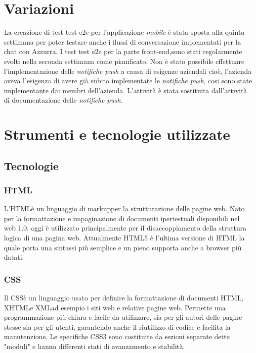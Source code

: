 \section{Variazioni}
La creazione di test \gls{test e2e}\ap{[g]} per l'applicazione \emph{mobile} è stata sposta alla quinta settimana per poter testare anche i flussi di conversazione implementati per la chat con Azzurra. I test \gls{test e2e}\ap{[g]} per la parte \gls{front-end}\ap{[g]},sono stati regolarmente svolti nella seconda settimana come pianificato. Non è stato possibile effettuare l'implementazione delle \emph{notifiche push} a causa di esigenze aziendali cioè, l'azienda aveva l'esigenza di avere già subito implementate le \emph{notifiche push}, cosi sono state implementante dai membri dell'azienda. L'attività è stata sostituita dall'attività di documentazione delle \emph{notifiche push}.

\section{Strumenti e tecnologie utilizzate}

\subsection{Tecnologie}

\subsubsection*{HTML}
L'\gls{HTML}\glsfirstoccur è un \gls{linguaggio di markup}\glsfirstoccur per la strutturazione delle pagine web. Nato per la formattazione e impaginazione di documenti ipertestuali disponibili nel web 1.0, oggi è utilizzato principalmente per il disaccoppiamento della struttura logica di una pagina web. Attualmente \gls{HTML}5 è l'ultima versione di \gls{HTML} la quale porta una sintassi più semplice e un pieno supporta anche a browser più datati.

\subsubsection*{CSS}
Il \gls{CSS}\glsfirstoccur è un linguaggio usato per definire la formattazione di documenti \gls{HTML}, \gls{XHTML}\glsfirstoccur e \gls{XML}\glsfirstoccur ad esempio i siti web e relative pagine web. Permette una programmazione più chiara e facile da utilizzare, sia per gli autori delle pagine stesse sia per gli utenti, garantendo anche il riutilizzo di codice e facilita la manutenzione. Le specifiche \gls{CSS}3 sono costituite da sezioni separate dette "moduli" e hanno differenti stati di avanzamento e stabilità.


